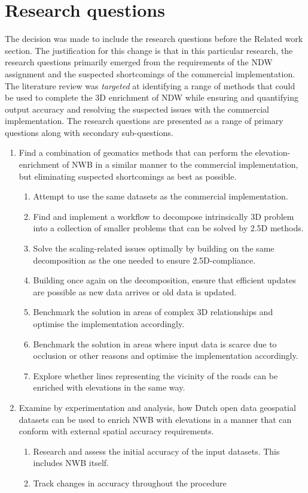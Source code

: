
\chapter{Research questions}
\label{chap:rq}

The decision was made to include the research questions before the Related work section. The justification for this change is that in this particular research, the research questions primarily emerged from the requirements of the NDW assignment and the suspected shortcomings of the commercial implementation. The literature review was \textit{targeted} at identifying a range of methods that could be used to complete the 3D enrichment of NDW while ensuring and quantifying output accuracy and resolving the suspected issues with the commercial implementation. The research questions are presented as a range of primary questions along with secondary sub-questions.


\begin{enumerate}
\item Find a combination of geomatics methods that can perform the elevation-enrichment of NWB in a similar manner to the commercial implementation, but eliminating suspected shortcomings as best as possible.
\begin{enumerate}
    \item Attempt to use the same datasets as the commercial implementation.
    \item Find and implement a workflow to decompose intrinsically 3D problem into a collection of smaller problems that can be solved by 2.5D methods.
    \item Solve the scaling-related issues optimally by building on the same decomposition as the one needed to ensure 2.5D-compliance.
    \item Building once again on the decomposition, ensure that efficient updates are possible as new data arrives or old data is updated.
    \item Benchmark the solution in areas of complex 3D relationships and optimise the implementation accordingly.
    \item Benchmark the solution in areas where input data is scarce due to occlusion or other reasons and optimise the implementation accordingly.
    \item Explore whether lines representing the vicinity of the roads can be enriched with elevations in the same way.
\end{enumerate}
\item Examine by experimentation and analysis, how Dutch open data geospatial datasets can be used to enrich NWB with elevations in a manner that can conform with external spatial accuracy requirements.
\begin{enumerate}
\item Research and assess the initial accuracy of the input datasets. This includes NWB itself.
\item Track changes in accuracy throughout the procedure
\end{enumerate}
\end{enumerate}